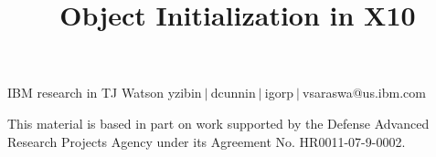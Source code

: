 \documentclass[9pt]{sigplanconf}
\begin{document}
\lstset{language=java,basicstyle=\ttfamily\small}


\title{Object Initialization in X10}


           {IBM research in TJ Watson}
           {yzibin$~|~$dcunnin$~|~$igorp$~|~$vsaraswa@us.ibm.com}


\maketitle


\begin{abstract}

\end{abstract}









\vspace{-0.3cm}


%

%





\acks
This material is based in part on work supported by the Defense Advanced Research Projects Agency under its Agreement No. HR0011-07-9-0002.



\end{document}

